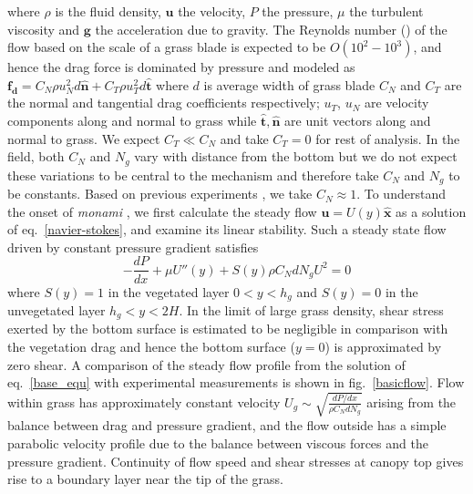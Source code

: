 \documentclass[aps,prl,twocolumn,superscriptaddress,10pt]{revtex4-1}  %
\newcommand{\bn}{{\boldsymbol{\hat{n}}}}
\newcommand{\bt}{{\boldsymbol{\hat{t}}}}
\newcommand{\bu}{\mathbf{u}}
\newcommand{\hg}{h_g}
\newcommand{\Rey}{\text{Re}}
\newcommand{\monami}{\textit{monami }}
\newcommand{\shreyas}[1]{}
\begin{document}
where $\rho$ is the fluid density, $\mathbf{u}$ the velocity, 
$P$ the pressure, $\mu$ the turbulent viscosity and $\mathbf{g}$ the acceleration due to gravity. 
The Reynolds number (\Rey) of the flow based on the scale of a grass blade is expected to be $O(10^2-10^3)$, and hence the drag force is dominated by pressure and modeled as 
$\mathbf{f_{d}}=C_N \rho u_{N}^{2}d\bn + C_{T}\rho u_{T}^{2}d\bt$ \shreyas{citation needed} 
where $d$ is average width of grass blade $C_{N}$ and $C_{T}$ are the normal and tangential drag coefficients respectively; $u_{T}$, $u_{N}$ are velocity components along and
normal to grass while $\bt,\bn$ are unit vectors along and normal to grass. 
We expect $C_T \ll C_N$ and take $C_T=0$ for rest of analysis. 
In the field, both $C_N$ and $N_g$ vary with distance from the bottom but we do not expect these variations to be central to the mechanism and therefore take $C_N$ and $N_g$ to be constants. 
Based on previous experiments \cite{Vivoni98}, we take $C_N \approx 1$.
\newline
To understand the onset of \monami, we first calculate the steady flow $\bu = U(y)\boldsymbol{\hat{x}}$ as a solution of eq.~\eqref{navier-stokes}, and examine its linear stability. 
Such a steady state flow driven by constant pressure gradient satisfies 
\begin{equation}
 -\frac{dP}{dx}+\mu U''(y) +S(y) \rho C_N d N_gU^2=0
\label{base_equ}
\end{equation}
where $S(y)=1$ in the vegetated layer $0<y<\hg$ and $S(y)=0$ in the unvegetated layer $\hg< y< 2H$. 
In the limit of large grass density, shear stress exerted by the bottom surface is estimated to be negligible in comparison with the vegetation drag and hence the bottom surface ($y=0$) is approximated by zero shear.   
A comparison of the steady flow profile from the solution of eq.~\eqref{base_equ} with experimental measurements is shown in fig.~\ref{basicflow}.
Flow within grass has approximately constant velocity $U_g \sim \sqrt{\frac{dP/dx}{\rho C_N dN_g}}$ arising from the balance between drag and pressure gradient, and the flow outside has a simple parabolic velocity profile due to the balance between viscous forces and the pressure gradient. 
Continuity of flow speed and shear stresses at canopy top gives rise to a boundary layer near the tip of the grass.
\end{document}
